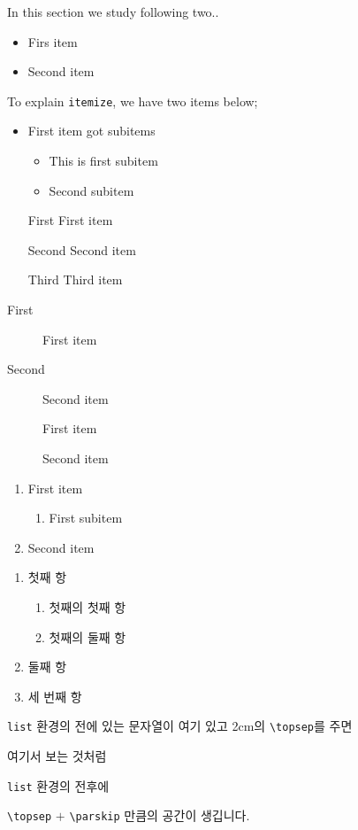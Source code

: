 \documentclass[11pt]{article}
\begin{document}
In this section we study following two..
\begin{itemize}
\item Firs item
\item Second item
\end{itemize}

To explain \texttt{itemize}, we have two items below;
\begin{itemize}
\item First item got subitems
  \begin{itemize}
    \item This is first subitem
    \item Second subitem
  \end{itemize}
\end{itemize}

\begin{itemize}
\item[First] First item
\item[Second] Second item
\item[Third] Third item
\end{itemize}

\begin{description}
\item[First] First item
\item[Second] Second item
\end{description}

\begin{description}
\item[] First item
\item[] Second item
\end{description}

\begin{enumerate}
\item First item
\begin{enumerate}
\item First subitem
\end{enumerate}
\item Second item
\end{enumerate}

\begin{enumerate}
\item 첫째 항
\begin{enumerate}
\item 첫째의 첫째 항
\item 첫째의 둘째 항
\end{enumerate}
\item 둘째 항
\item 세 번째 항
\end{enumerate}

\texttt{list} 환경의 전에 있는 문자열이 여기 있고  2cm의 \verb|\topsep|를 주면
\begin{list}{\bfseries 항목}{\topsep=2cm}
\item 여기서 보는 것처럼
\item \texttt{list} 환경의 전후에
\end{list}
\verb|\topsep| $+$ \verb|\parskip| 만큼의 공간이 생깁니다.
\end{document}
